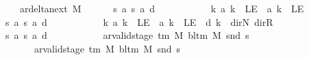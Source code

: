 \begin{isabellebody}
\ \ \ \ \ \ \ \ {\isasymunion}\ ar{\isacharunderscore}{\kern0pt}delta{\isacharunderscore}{\kern0pt}next\ M{\isacharparenright}{\kern0pt}\isanewline
\ \ \ \ \ {\isasyminter}\ {\isacharbraceleft}{\kern0pt}{\isacharparenleft}{\kern0pt}s{\isacharcomma}{\kern0pt}\ a{\isacharcomma}{\kern0pt}\ s{\isacharprime}{\kern0pt}{\isacharcomma}{\kern0pt}\ a{\isacharprime}{\kern0pt}{\isacharcomma}{\kern0pt}\ d{\isacharparenright}{\kern0pt}{\isachardot}{\kern0pt}\isanewline
\ \ \ \ \ \ \ \ \ \ \ {\isasymforall}k{\isachardot}{\kern0pt}\ a{\isacharprime}{\kern0pt}\ k\ {\isacharequal}{\kern0pt}\ LE{}\ {\isasymlongrightarrow}\ a\ k\ {\isacharequal}{\kern0pt}\ LE{}{\isacharbraceright}{\kern0pt}\isanewline
\ \ \ \ \ {\isasyminter}\ {\isacharbraceleft}{\kern0pt}{\isacharparenleft}{\kern0pt}s{\isacharcomma}{\kern0pt}\ a{\isacharcomma}{\kern0pt}\ s{\isacharprime}{\kern0pt}{\isacharcomma}{\kern0pt}\ a{\isacharprime}{\kern0pt}{\isacharcomma}{\kern0pt}\ d{\isacharparenright}{\kern0pt}{\isachardot}{\kern0pt}\isanewline
\ \ \ \ \ \ \ \ \ \ \ {\isasymforall}k{\isachardot}{\kern0pt}\ a\ k\ {\isacharequal}{\kern0pt}\ LE{}\ {\isasymlongrightarrow}\ a{\isacharprime}{\kern0pt}\ k\ {\isacharequal}{\kern0pt}\ LE{}\ {\isasymand}\ d\ k\ {\isasymin}\ {\isacharbraceleft}{\kern0pt}dir{\isachardot}{\kern0pt}N{\isacharcomma}{\kern0pt}\ dir{\isachardot}{\kern0pt}R{\isacharbraceright}{\kern0pt}{\isacharbraceright}{\kern0pt}\isanewline
\ \ \ \ \ {\isasyminter}\ {\isacharbraceleft}{\kern0pt}{\isacharparenleft}{\kern0pt}s{\isacharcomma}{\kern0pt}\ a{\isacharcomma}{\kern0pt}\ s{\isacharprime}{\kern0pt}{\isacharcomma}{\kern0pt}\ a{\isacharprime}{\kern0pt}{\isacharcomma}{\kern0pt}\ d{\isacharparenright}{\kern0pt}{\isachardot}{\kern0pt}\isanewline
\ \ \ \ \ \ \ \ \ \ \ ar{\isacharunderscore}{\kern0pt}valid{\isacharunderscore}{\kern0pt}stage\ {\isacharparenleft}{\kern0pt}{\isasymGamma}{\isacharunderscore}{\kern0pt}tm\ M{\isacharparenright}{\kern0pt}\ {\isacharparenleft}{\kern0pt}bl{\isacharunderscore}{\kern0pt}tm\ M{\isacharparenright}{\kern0pt}\ {\isacharparenleft}{\kern0pt}snd\ s{\isacharparenright}{\kern0pt}\isanewline
\ \ \ \ \ \ \ \ \ \ \ {\isasymand}\ ar{\isacharunderscore}{\kern0pt}valid{\isacharunderscore}{\kern0pt}stage\ {\isacharparenleft}{\kern0pt}{\isasymGamma}{\isacharunderscore}{\kern0pt}tm\ M{\isacharparenright}{\kern0pt}\ {\isacharparenleft}{\kern0pt}bl{\isacharunderscore}{\kern0pt}tm\ M{\isacharparenright}{\kern0pt}\ {\isacharparenleft}{\kern0pt}snd\ s{\isacharprime}{\kern0pt}{\isacharparenright}{\kern0pt}{\isacharbraceright}{\kern0pt}\isanewline

\end{isabellebody}

